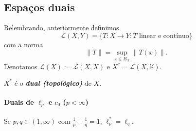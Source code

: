 \documentclass[portuguese]{article}
\theoremstyle{definition}
\begin{document}
	\subsection{Espaços duais}
	Relembrando, anteriormente definimos
	\[\mathcal{L}(X,Y)=\{T:X\to Y:T\text{ linear e contínuo}\}\]
	com a norma
	\[\| T\|=\sup_{x\in B_X}\| T(x)\|.\]
	Denotamos $\mathcal{L}(X):=\mathcal{L}(X,X)$ e $X^*=\mathcal{L}(X,\mathbb{K})$.
	
	\begin{defn}
		$X^*$ é o \textbf{\textit{dual (topológico)}} de $X$.
	\end{defn}
	
	\paragraph{Duais de $\ell_p$ e $c_0$ ($p<\infty$)}
	\begin{teo}
		Se $p,q\in(1,\infty)$ com $\frac{1}{p}+\frac{1}{q}=1$, $\ell_p^*=\ell_q$.
	\end{teo}
\end{document}
